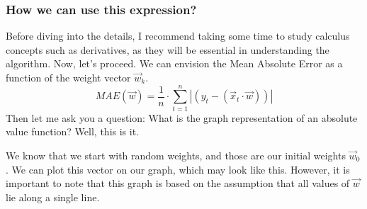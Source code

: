 \subsubsection{How we can use this expression?}
Before diving into the details, I recommend taking some time to study calculus concepts such as derivatives, as
they
will be essential in understanding the algorithm. Now, let's proceed. We can envision the Mean Absolute Error
as a function of the weight vector $\vec{w}_k$.
\[
MAE(\vec{w}) = \frac{1}{n} \cdot \sum_{t = 1}^{n}|(y_t - (\vec{x}_t \cdot \vec{w}))|
\]
Then let me ask you a question: What is the graph representation of an absolute value function? Well, this is it.
\begin{center}
\end{center}

We know that we start with random weights, and those are our initial weights $\vec{w}_0$. We can plot this
vector on our graph, which may look like this. However, it is important to note that this graph is based on
the assumption that all values of $\vec{w}$ lie along a single line.

